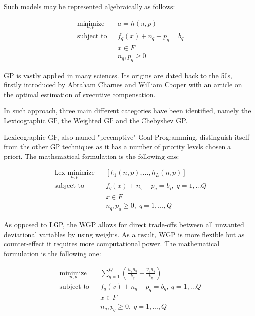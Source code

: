 \begin{doublespace}
Such models may be represented algebraically as follows:

\begin{equation*}
\begin{aligned}
& \underset{n,p}{\text{minimize}}
& & a=h(n,p) \\
& \text{subject to}
& & f_q(x)+n_q-p_q=b_q \\
& & & x\in F \\
& & & n_q,p_q\geq 0 
\end{aligned}
\end{equation*}

GP is vastly applied in many sciences\cite{Tamiz1998}. Its origins are dated back to the 50s, firstly introduced by Abraham Charnes and William Cooper\cite{Charnes1955} with an article on the optimal estimation of executive compensation.

In such approach, three main different categories have been identified, namely the Lexicographic GP, the Weighted GP and the Chebyshev GP.

Lexicographic GP, also named "preemptive" Goal Programming, distinguish itself from the other GP techniques as it has a number of priority levels chosen a priori. The mathematical formulation is the following one:

\begin{equation*}
\begin{aligned}
& \underset{n,p}{\text{Lex minimize}}
& & [h_1(n,p),...,h_L(n,p)] \\
& \text{subject to}
& & f_q(x)+n_q-p_q=b_q, \; q=1,...Q \\
& & & x\in F \\
& & & n_q,p_q\geq 0, \; q=1,...,Q 
\end{aligned}
\end{equation*}

As opposed to LGP, the WGP allows for direct trade-offs between all unwanted deviational variables by using weights. As a result, WGP is more flexible but as counter-effect it requires more computational power. The mathematical formulation is the following one:

\begin{equation*}
\begin{aligned}
& \underset{n,p}{\text{minimize}}
& & \sum_{q=1}^{Q}(\frac{u_q n_q}{k_q}+\frac{v_q n_q}{k_q}) \\
& \text{subject to}
& & f_q(x)+n_q-p_q=b_q, \; q=1,...Q \\
& & & x\in F \\
& & & n_q,p_q\geq 0, \; q=1,...,Q 
\end{aligned}
\end{equation*}


\end{doublespace}
